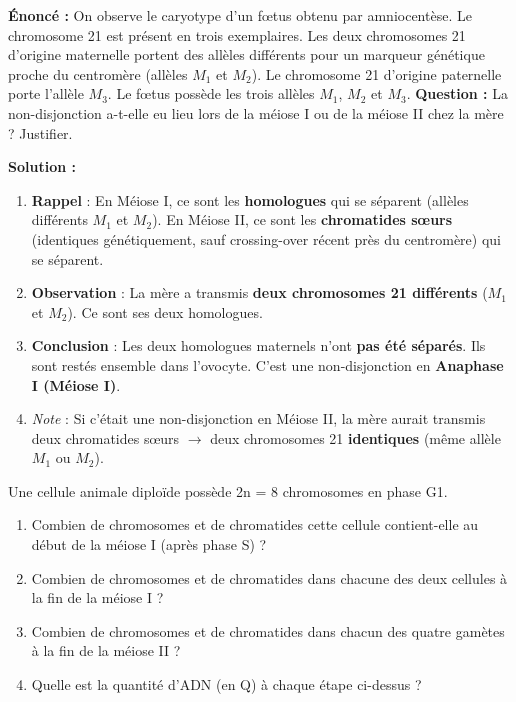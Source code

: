 \documentclass[11pt]{article}
\begin{document}
\begin{exoresolu}
\textbf{Énoncé :} On observe le caryotype d'un fœtus obtenu par amniocentèse. Le chromosome 21 est présent en trois exemplaires. Les deux chromosomes 21 d'origine maternelle portent des allèles différents pour un marqueur génétique proche du centromère (allèles $M_1$ et $M_2$). Le chromosome 21 d'origine paternelle porte l'allèle $M_3$. Le fœtus possède les trois allèles $M_1$, $M_2$ et $M_3$.
\textbf{Question :} La non-disjonction a-t-elle eu lieu lors de la méiose I ou de la méiose II chez la mère ? Justifier.

\tcblower
\textbf{Solution :}
\begin{enumerate}
    \item \textbf{Rappel} : En Méiose I, ce sont les \textbf{homologues} qui se séparent (allèles différents $M_1$ et $M_2$). En Méiose II, ce sont les \textbf{chromatides sœurs} (identiques génétiquement, sauf crossing-over récent près du centromère) qui se séparent.
    \item \textbf{Observation} : La mère a transmis \textbf{deux chromosomes 21 différents} ($M_1$ et $M_2$). Ce sont ses deux homologues.
    \item \textbf{Conclusion} : Les deux homologues maternels n'ont \textbf{pas été séparés}. Ils sont restés ensemble dans l'ovocyte. C'est une non-disjonction en \textbf{Anaphase I (Méiose I)}.
    \item \textit{Note} : Si c'était une non-disjonction en Méiose II, la mère aurait transmis deux chromatides sœurs $\rightarrow$ deux chromosomes 21 \textbf{identiques} (même allèle $M_1$ ou $M_2$).
\end{enumerate}
\end{exoresolu}

\begin{exercice}
Une cellule animale diploïde possède 2n = 8 chromosomes en phase G1.
\begin{enumerate}
    \item Combien de chromosomes et de chromatides cette cellule contient-elle au début de la méiose I (après phase S) ?
    \item Combien de chromosomes et de chromatides dans chacune des deux cellules à la fin de la méiose I ?
    \item Combien de chromosomes et de chromatides dans chacun des quatre gamètes à la fin de la méiose II ?
    \item Quelle est la quantité d'ADN (en Q) à chaque étape ci-dessus ?
\end{enumerate}
\end{exercice}
\end{document}
